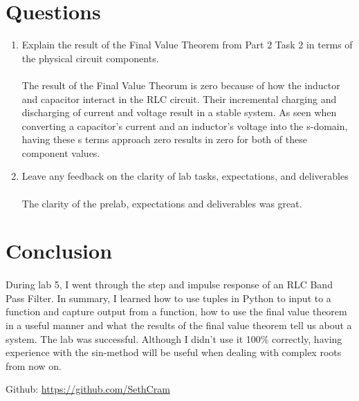 \documentclass[12pt]{report}
\begin{document}
\section{Questions} %
    \begin{enumerate}
        \item Explain the result of the Final Value Theorem from Part 2 Task 2 in terms of the physical circuit components.
        \paragraph{} The result of the Final Value Theorum is zero because of how the inductor and capacitor interact in the RLC circuit. Their incremental charging and discharging of current and voltage result in a stable system. As seen when converting a capacitor's current and an inductor's voltage into the s-domain, having these s terms approach zero results in zero for both of these component values. 
        
        \item Leave any feedback on the clarity of lab tasks, expectations, and deliverables
        \paragraph{} The clarity of the prelab, expectations and deliverables was great. 
    \end{enumerate}

\section{Conclusion}


    \paragraph{} During lab 5, I went through the step and impulse response of an RLC Band Pass Filter. In summary, I learned how to use tuples in Python to input to a function and capture output from a function, how to use the final value theorem in a useful manner and what the results of the final value theorem tell us about a system. The lab was successful. Although I didn't use it 100\% correctly, having experience with the sin-method will be useful when dealing with complex roots from now on. 

Github: \url{https://github.com/SethCram} 

\newpage
\end{document}
